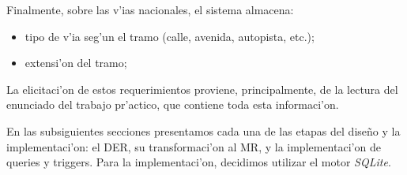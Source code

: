 Finalmente, sobre las v'ias nacionales, el sistema almacena:

\begin{itemize}
\item tipo de v'ia seg'un el tramo (calle, avenida, autopista, etc.);
\item extensi'on del tramo;
\end{itemize}

La elicitaci'on de estos requerimientos proviene, principalmente, de la lectura del enunciado del trabajo pr'actico, que contiene toda esta informaci'on.

En las subsiguientes secciones presentamos cada una de las etapas del dise\~{n}o y la implementaci'on: el DER, su transformaci'on al MR, y la implementaci'on de queries y triggers. Para la implementaci'on, decidimos utilizar el motor \textit{SQLite}.